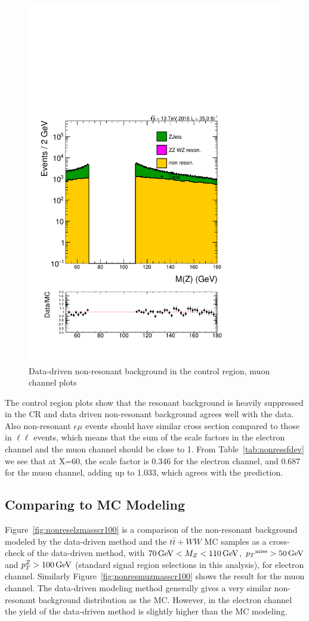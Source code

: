 \begin{figure}[htbp]
\begin{center}
\includegraphics[width=0.39\linewidth, page=4]{figures/test_metzpt50_RhoWt_puWeight68075_metfilter_mu_.pdf}
\caption{Data-driven non-resonant background in the control region, muon channel plots}
\label{fig:nonresmucr}
\end{center}
\end{figure}

\vspace{0.3cm}
The control region plots show that the resonant background is heavily suppressed in the CR and data driven non-resonant background agrees well with the data. Also non-resonant $e\mu$ events should have similar cross section compared to those in $\ell\ell$ events, which means that the sum of the scale factors in the electron channel and the muon channel should be close to 1. From Table~\ref{tab:nonressfdev} we see that at X=60, the scale factor is 0.346 for the electron channel, and 0.687 for the muon channel, adding up to 1.033, which agrees with the prediction.

\subsection{Comparing to MC Modeling}
Figure~\ref{fig:nonreselzmasscr100} is a comparison of the non-resonant background modeled by the data-driven method and the $t\bar{t}+WW$ MC samples as a cross-check of the data-driven method, with $70\,\text{Ge\hspace{-.08em}V}<M_{Z}<110\,\text{Ge\hspace{-.08em}V}$, ${p_T}^\text{miss} >50\,\text{Ge\hspace{-.08em}V}$ and $p_{T}^{Z}>100\,\text{Ge\hspace{-.08em}V}$ (standard signal region selections in this analysis), for electron channel. Similarly Figure~\ref{fig:nonresmuzmasscr100} shows the result for the muon channel. The data-driven modeling method generally gives a very similar non-resonant background distribution as the MC. However, in the electron channel the yield of the data-driven method is slightly higher than the MC modeling.

